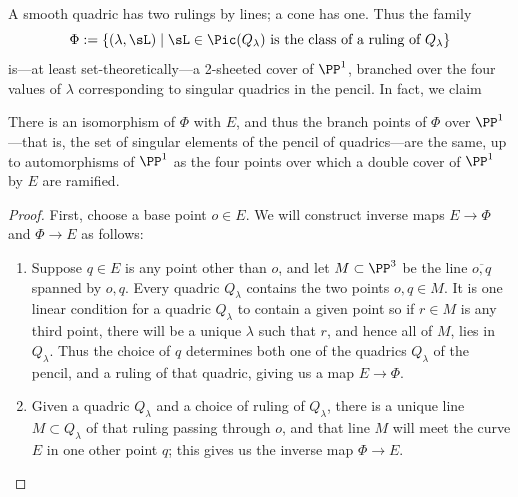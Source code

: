  A smooth quadric has two rulings by lines; a cone has one. Thus the family
$$
\Phi := \{ (\lambda, \sL) \mid \sL \in \Pic(Q_\lambda) \text{ is the class of a ruling of } Q_\lambda \}
$$
is---at least set-theoretically---a 2-sheeted cover of $\PP^1$, branched over the four values of $\lambda$ corresponding to singular quadrics in the pencil. In fact, we claim

\begin{proposition}\label{rulings on pencil}
There is an isomorphism of $\Phi$ with $E$, and thus the branch points of $\Phi$ over $\PP^1$---that is, the set of singular elements of the pencil of quadrics---are the same, up to automorphisms of $\PP^1$ as the four points over which a double cover of $\PP^1$ by $E$ are ramified.
\end{proposition} 


\begin{proof}
First, choose a base point $o \in E$. We will construct inverse maps $E \to \Phi$ and $\Phi \to E$ as follows:
\begin{enumerate}

\item Suppose $q \in E$ is any point other than $o$, and let $M\subset \PP^3$ be the line $\overline{o,q}$ spanned by $o,q$. Every quadric $Q_\lambda$ contains the two points $o, q \in M$. It is one linear condition
for a quadric $Q_{\lambda}$ to contain a given point  so if $r\in M$ is any third point, there will be a unique $\lambda$ such that $r$, and hence all of $M$, lies in $Q_\lambda$. Thus the choice of $q$ determines both one of the quadrics $Q_\lambda$ of the pencil, and a ruling of that quadric, giving us a map $E \to \Phi$.

\item  Given a quadric $Q_\lambda$ and a choice of ruling of $Q_\lambda$, there is a unique line $M \subset Q_\lambda$ of that ruling passing through $o$, and that line $M$ will meet the curve $E$ in one other point $q$; this gives us the inverse map $\Phi \to E$.
\end{enumerate}
\end{proof}

